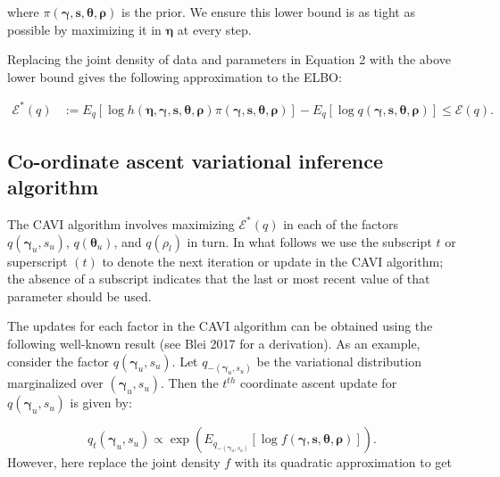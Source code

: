\documentclass[]{article}
\begin{document}
where
\(\pi \left(\boldsymbol{\gamma}, \mathbf{s}, \boldsymbol{\theta}, \boldsymbol{\rho} \right)\)
is the prior. We ensure this lower bound is as tight as possible by
maximizing it in \(\boldsymbol{\eta}\) at every step.

Replacing the joint density of data and parameters in Equation 2 with
the above lower bound gives the following approximation to the ELBO:

\begin{align*}
\mathcal{E}^*(q) & :=  E_{q} \left[\log h\left(\boldsymbol{\eta}, \boldsymbol{\gamma}, \mathbf{s}, \boldsymbol{\theta}, \boldsymbol{\rho} \right) \pi \left(\boldsymbol{\gamma}, \mathbf{s}, \boldsymbol{\theta}, \boldsymbol{\rho} \right) \right] - E_{q} \left[\log q \left(\boldsymbol{\gamma}, \mathbf{s}, \boldsymbol{\theta}, \boldsymbol{\rho} \right) \right] \leq \mathcal{E}(q).
\end{align*}

\hypertarget{co-ordinate-ascent-variational-inference-algorithm}{%
\subsection{Co-ordinate ascent variational inference
algorithm}\label{co-ordinate-ascent-variational-inference-algorithm}}

The CAVI algorithm involves maximizing \(\mathcal{E}^*(q)\) in each of
the factors \(q\left(\boldsymbol{\gamma}_u, s_u \right)\),
\(q \left( \boldsymbol{\theta}_u \right)\), and \(q(\rho_l)\) in turn.
In what follows we use the subscript \(t\) or superscript \((t)\) to
denote the next iteration or update in the CAVI algorithm; the absence
of a subscript indicates that the last or most recent value of that
parameter should be used.

The updates for each factor in the CAVI algorithm can be obtained using
the following well-known result (see Blei 2017 for a derivation). As an
example, consider the factor
\(q\left(\boldsymbol{\gamma}_u, s_u \right)\). Let
\(q_{-\left(\boldsymbol{\gamma}_u, s_u \right)}\) be the variational
distribution marginalized over \((\boldsymbol{\gamma}_u, s_u)\). Then
the \(t^{th}\) coordinate ascent update for
\(q(\boldsymbol{\gamma}_u, s_u)\) is given by:

\[ q_t \left( \boldsymbol{\gamma}_u, s_u \right) \propto \exp \left( E_{q_{-\left(\boldsymbol{\gamma}_u, s_u \right)}} \left[ \log f \left(\boldsymbol{\gamma}, \mathbf{s}, \boldsymbol{\theta}, \boldsymbol{\rho} \right) \right] \right).\]
However, here replace the joint density \(f\) with its quadratic
approximation to get
\end{document}
